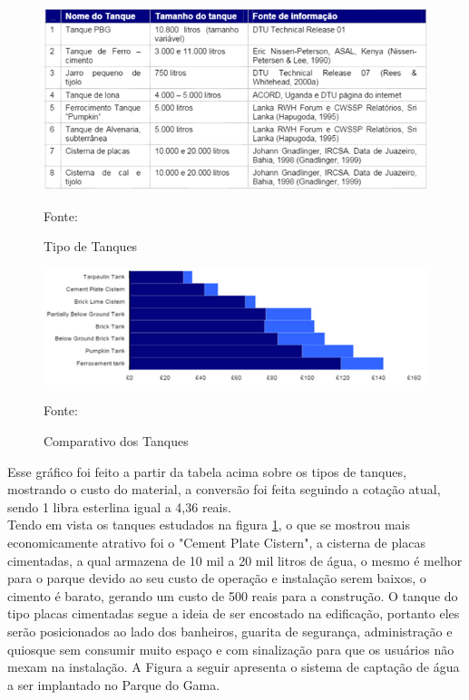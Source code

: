\begin{figure}[h!]
	\centering
	\label{Tipo de Tanques}
		\includegraphics[keepaspectratio=true,scale=1.2]{figuras/TipoDeTanques.png}
	\caption{Tipo de Tanques}
	\small{Fonte:  \cite{TERRYTHOMAS}}
\end{figure}

\begin{figure}[h!]
	\centering
	\label{Comparativo dos Tanques}
		\includegraphics[keepaspectratio=true,scale=1.2]{figuras/ComparativoDosTanques.png}
	\caption{Comparativo dos Tanques}
	\small{Fonte:  \cite{TERRY THOMAS}}
\end{figure}

 Esse gr\'afico foi feito a partir da tabela acima sobre os tipos de tanques, mostrando o custo do material, a convers\~ao foi feita seguindo a cota\c{c}\~ao atual, sendo 1 libra esterlina igual a 4,36 reais. \\ Tendo em vista os tanques estudados na figura \ref{Tipo de Tanques}, o que se mostrou mais economicamente atrativo foi o "Cement Plate Cistern", a cisterna de placas cimentadas, a qual armazena de 10 mil a 20 mil litros de \'agua, o mesmo \'e melhor para o parque devido ao seu custo de opera\c{c}\~ao e instala\c{c}\~ao serem baixos, o cimento \'e barato, gerando um custo de 500 reais para a constru\c{c}\~ao. O tanque do tipo placas cimentadas segue a ideia de ser encostado na edifica\c{c}\~ao, portanto eles ser\~ao posicionados ao lado dos banheiros, guarita de seguran\c{c}a, administra\c{c}\~ao e quiosque sem consumir muito espa\c{c}o e com sinaliza\c{c}\~ao para que os usu\'arios n\~ao mexam na instala\c{c}\~ao. A Figura a seguir apresenta o sistema de capta\c{c}\~ao de \'agua a ser implantado no Parque do Gama.\cite{JOHANN} 
 
